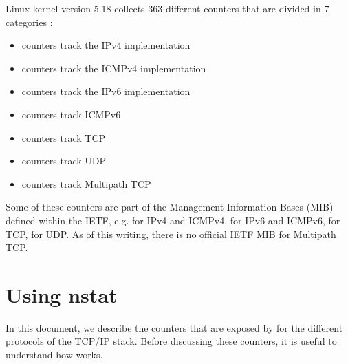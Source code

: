 \documentclass[letterpaper,10pt,english]{sphinxmanual}
\begin{document}
\sphinxAtStartPar
Linux kernel version 5.18 collects 363 different counters that are divided in 7 categories :
\begin{itemize}
\item {} 
 counters track the IPv4 implementation

\item {} 
 counters track the ICMPv4 implementation

\item {} 
 counters track the IPv6 implementation

\item {} 
 counters track ICMPv6

\item {} 
 counters track TCP

\item {} 
 counters track UDP

\item {} 
 counters track Multipath TCP

\end{itemize}

\sphinxAtStartPar
Some of these counters are part of the Management Information Bases (MIB) defined
within the IETF, e.g.  for IPv4 and ICMPv4,  for IPv6 and ICMPv6,   for TCP,  for UDP. As of this writing, there is no official IETF MIB for Multipath TCP.


\section{Using nstat}
\label{\detokenize{nstat-intro:using-nstat}}
\sphinxAtStartPar
In this document, we describe the counters that are exposed by
for the different protocols of the TCP/IP stack. Before discussing
these counters, it is useful to understand how
 works.
\end{document}
